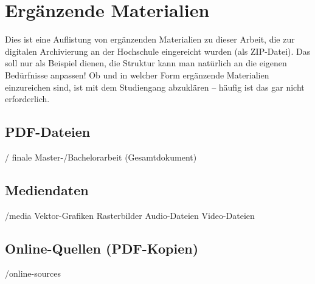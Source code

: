 \chapter{Ergänzende Materialien}
\label{app:materials}


Dies ist eine Auflistung von ergänzenden Materialien zu dieser Arbeit,
die zur digitalen Archivierung an der Hochschule eingereicht wurden 
(\zB als ZIP-Datei).
Das soll nur als Beispiel dienen, die Struktur kann man natürlich
an die eigenen Bedürfnisse anpassen! Ob und in welcher Form ergänzende
Materialien einzureichen sind, ist mit dem Studiengang abzuklären -- häufig
ist das gar nicht erforderlich.


\section{PDF-Dateien}


\begin{FileList}{/}
	 finale Master-/Bachelorarbeit (Gesamtdokument)
\end{FileList}

\section{Mediendaten}


\begin{FileList}{/media}
			Vektor-Grafiken 
		Rasterbilder
						Audio-Dateien
						Video-Dateien
\end{FileList}


\section{Online-Quellen (PDF-Kopien)}

\begin{FileList}{/online-sources}
	 {\backtrackerfalse\parencite{WikiReliquienschrein2023}}
\end{FileList}
